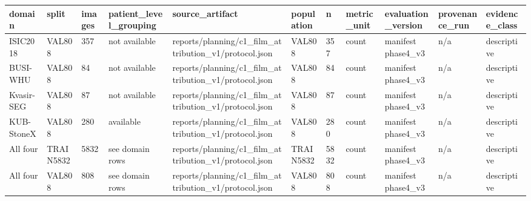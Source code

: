 \begin{tabular}{lllllllllll}
\hline
domain & split & images & patient\_level\_grouping & source\_artifact & population & n & metric\_unit & evaluation\_version & provenance\_run & evidence\_class \\
\hline
ISIC2018 & VAL808 & 357 & not available & reports/planning/c1\_film\_attribution\_v1/protocol.json & VAL808 & 357 & count & manifest phase4\_v3 & n/a & descriptive \\
BUSI-WHU & VAL808 & 84 & not available & reports/planning/c1\_film\_attribution\_v1/protocol.json & VAL808 & 84 & count & manifest phase4\_v3 & n/a & descriptive \\
Kvasir-SEG & VAL808 & 87 & not available & reports/planning/c1\_film\_attribution\_v1/protocol.json & VAL808 & 87 & count & manifest phase4\_v3 & n/a & descriptive \\
KUB-StoneX & VAL808 & 280 & available & reports/planning/c1\_film\_attribution\_v1/protocol.json & VAL808 & 280 & count & manifest phase4\_v3 & n/a & descriptive \\
All four & TRAIN5832 & 5832 & see domain rows & reports/planning/c1\_film\_attribution\_v1/protocol.json & TRAIN5832 & 5832 & count & manifest phase4\_v3 & n/a & descriptive \\
All four & VAL808 & 808 & see domain rows & reports/planning/c1\_film\_attribution\_v1/protocol.json & VAL808 & 808 & count & manifest phase4\_v3 & n/a & descriptive \\
\hline
\end{tabular}
